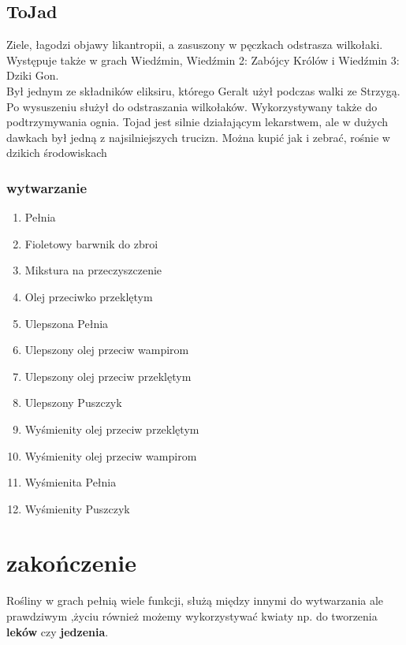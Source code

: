 \documentclass[12pt, letterpaper, titlepage]{article}
\begin{document}
\subsection{ToJad}
Ziele, łagodzi objawy likantropii, a zasuszony w pęczkach odstrasza wilkołaki. Występuje także w grach Wiedźmin, Wiedźmin 2: Zabójcy Królów i Wiedźmin 3: Dziki Gon.\\
Był jednym ze składników eliksiru, którego Geralt użył podczas walki ze Strzygą. Po wysuszeniu służył do odstraszania wilkołaków. Wykorzystywany także do podtrzymywania ognia. Tojad jest silnie działającym lekarstwem, ale w dużych dawkach był jedną z najsilniejszych trucizn. Można kupić jak i zebrać, rośnie w dzikich środowiskach
\subsubsection{wytwarzanie}
\begin{enumerate}
\item Pełnia
\item Fioletowy barwnik do zbroi
\item Mikstura na przeczyszczenie
\item Olej przeciwko przeklętym
\item Ulepszona Pełnia
\item Ulepszony olej przeciw wampirom
\item Ulepszony olej przeciw przeklętym
\item Ulepszony Puszczyk
\item Wyśmienity olej przeciw przeklętym
\item Wyśmienity olej przeciw wampirom
\item Wyśmienita Pełnia
\item Wyśmienity Puszczyk

\end{enumerate}
\newpage
\section{zakończenie}
Rośliny w grach pełnią wiele funkcji, służą między innymi do wytwarzania ale prawdziwym ,życiu również możemy wykorzystywać kwiaty np. do tworzenia \textbf{leków} czy \textbf{jedzenia}.
\end{document}
